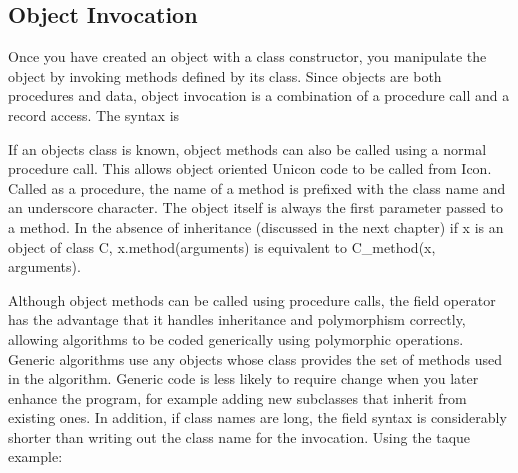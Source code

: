 \subsection{Object Invocation}

Once you have created an object with a class constructor, you manipulate
the object by invoking methods defined by its class. Since objects are
both procedures and data, object invocation is a combination of a procedure call and a record
access. The syntax is


If an object{\textquotesingle}s class is known, object methods can also
be called using a normal procedure call. This allows object oriented
Unicon code to be called from Icon. Called as a procedure, the name of
a method is prefixed with the class name and an underscore character.
The object itself is always the first parameter passed to a method. In
the absence of inheritance (discussed in the next chapter) if
\textsf{x} is an object of class \textsf{C},
\textsf{x.method(arguments)} is equivalent to \textsf{C\_method(x,
arguments)}.

Although object methods can be called using procedure calls, the field
operator has the advantage that it handles inheritance and polymorphism
correctly, allowing algorithms to be coded generically using
polymorphic operations. Generic algorithms use any objects whose class
provides the set of methods used in the algorithm. Generic code is less
likely to require change when you later enhance the program, for
example adding new subclasses that inherit from
existing ones. In addition, if class names are long, the field syntax
is considerably shorter than writing out the class name for the
invocation. Using the taque example: 


